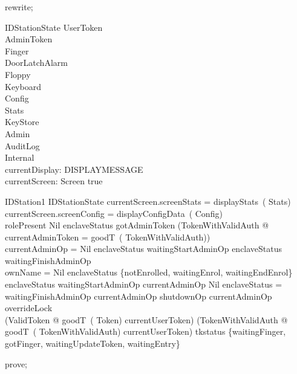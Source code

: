 \begin{zproof}
rewrite;
\end{zproof}

\begin{schema}{IDStationState}
  UserToken\\
  AdminToken\\
  Finger\\
  DoorLatchAlarm\\
  Floppy\\
  Keyboard\\
  Config\\
  Stats\\
  KeyStore\\
  Admin\\
  AuditLog\\
  Internal\\
  currentDisplay: DISPLAYMESSAGE\\
  currentScreen: Screen
\where
  true
\end{schema}

\begin{schema}{IDStation1}
  IDStationState
\where
  currentScreen.screenStats = displayStats~( \theta  Stats)\\
  currentScreen.screenConfig = displayConfigData~( \theta  Config)\\
  rolePresent \neq  Nil \implies  enclaveStatus \neq  gotAdminToken \land  (\exists  TokenWithValidAuth @ currentAdminToken = goodT~( \theta  TokenWithValidAuth))\\
  currentAdminOp = Nil \implies  enclaveStatus \neq  waitingStartAdminOp \land  enclaveStatus \neq  waitingFinishAdminOp\\
  ownName = Nil \implies  enclaveStatus \in  \{notEnrolled, waitingEnrol, waitingEndEnrol\}\\
  enclaveStatus \neq  waitingStartAdminOp \land  currentAdminOp \neq  Nil \implies  enclaveStatus = waitingFinishAdminOp \land  \The currentAdminOp \neq  shutdownOp \land  \The currentAdminOp \neq  overrideLock\\
  (\forall  ValidToken @ goodT~( \theta  Token) \neq  currentUserToken) \land  (\forall  TokenWithValidAuth @ goodT~( \theta  TokenWithValidAuth) \neq  currentUserToken) \implies  tkstatus \notin  \{waitingFinger, gotFinger, waitingUpdateToken, waitingEntry\}
\end{schema}

\begin{zproof}
prove;
\end{zproof}

